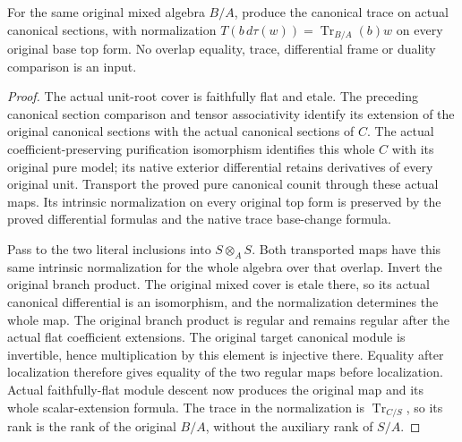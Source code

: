 \begin{theorem}
\label{thm:kn-global-trace-mixed-descent}
\notready
For the same original mixed algebra $B/A$, produce the canonical trace on
actual canonical sections, with normalization
$T(b\,d\tau(w))=\operatorname{Tr}_{B/A}(b)w$ on every original base top
form.  No overlap equality, trace, differential frame or duality
comparison is an input.
\end{theorem}
\begin{proof}
The actual unit-root cover is faithfully flat and etale.  The preceding
canonical section comparison and tensor associativity identify its
extension of the original canonical sections with the actual canonical
sections of $C$.  The actual coefficient-preserving purification
isomorphism identifies this whole $C$ with its original pure model; its
native exterior differential retains derivatives of every original unit.
Transport the proved pure canonical counit through these actual maps.
Its intrinsic normalization on every original top form is preserved by
the proved differential formulas and the native trace base-change formula.

Pass to the two literal inclusions into $S\otimes_A S$.  Both transported
maps have this same intrinsic normalization for the whole algebra over
that overlap.  Invert the original branch product.  The original mixed
cover is etale there, so its actual canonical differential is an
isomorphism, and the normalization determines the whole map.  The original
branch product is regular and remains regular after the actual flat
coefficient extensions.  The original target canonical module is
invertible, hence multiplication by this element is injective there.
Equality after localization therefore gives equality of the two regular
maps before localization.  Actual faithfully-flat module descent now
produces the original map and its whole scalar-extension formula.
The trace in the normalization is $\operatorname{Tr}_{C/S}$, so its rank
is the rank of the original $B/A$, without the auxiliary rank of $S/A$.
\end{proof}


